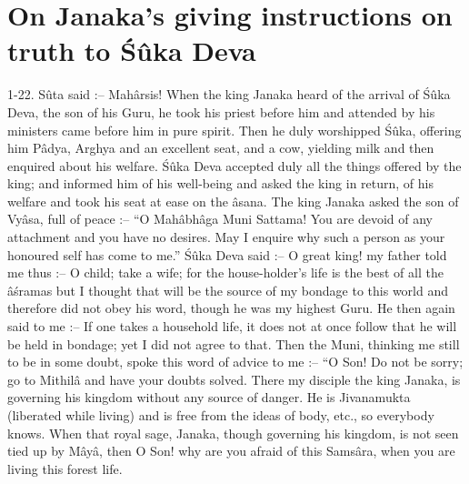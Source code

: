 \chapter{On Janaka’s giving instructions on truth to \'S\^uka Deva}

1-22. S\^uta said :-- Mah\^arsis! When the king Janaka heard of the arrival of \'S\^uka Deva, the son of his Guru, he took his priest before him and attended by his ministers came before him in pure spirit. Then he duly worshipped \'S\^uka, offering him P\^adya, Arghya and an excellent seat, and a cow, yielding milk and then enquired about his welfare. \'S\^uka Deva accepted duly all the things offered by the king; and informed him of his well-being and asked the king in return, of his welfare and took his seat at ease on the \^asana. The king Janaka asked the son of Vy\^asa, full of peace :-- ``O Mah\^abh\^aga Muni Sattama! You are devoid of any attachment and you have no desires. May I enquire why such a person as your honoured self has come to me.'' \'S\^uka Deva said :-- O great king! my father told me thus :-- O child; take a wife; for the house-holder's life is the best of all the \^a\'sramas but I thought that will be the source of my bondage to this world and therefore did not obey his word, though he was my highest Guru. He then again said to me :-- If one takes a household life, it does not at once follow that he will be held in bondage; yet I did not agree to that. Then the Muni, thinking me still to be in some doubt, spoke this word of advice to me :-- ``O Son! Do not be sorry; go to Mithil\^a and have your doubts solved. There my disciple the king Janaka, is governing his kingdom without any source of danger. He is Jivanamukta (liberated while living) and is free from the ideas of body, etc., so everybody knows. When that royal sage, Janaka, though governing his kingdom, is not seen tied up by M\^ay\^a, then O Son! why are you afraid of this Sams\^ara, when you are living this forest life.

